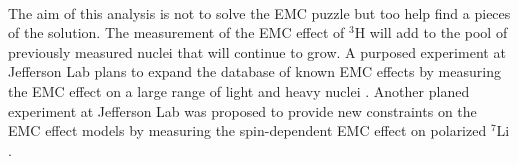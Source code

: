 \paragraph{}The aim of this analysis is not to solve the EMC puzzle but too help find a pieces of the solution. The measurement of the EMC effect of $^3$H will add to the pool of previously measured nuclei that will continue to grow. A purposed experiment at Jefferson Lab plans to expand the database of known EMC effects by measuring the EMC effect on a large range of light and heavy nuclei \cite{pro_gaskell}. Another planed experiment at Jefferson Lab was proposed to provide new constraints on the EMC effect models by measuring the spin-dependent EMC effect on polarized $^7$Li \cite{pro_brooks}.
